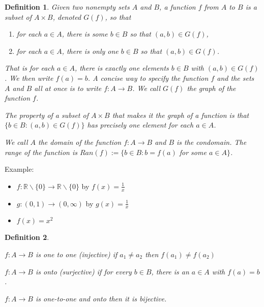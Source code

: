 \documentclass[12pt]{article}
\theoremstyle{plain}
\newtheorem{definition}{Definition}[subsection]
\begin{document}
	\begin{definition}
		Given two nonempty sets $A$ and $B$, a function $f$ from $A$ to $B$ is a 
		subset of $A \times B$, denoted $G(f)$, so that
		\begin{enumerate}
			\item for each $a\in A$, there is some $b\in B$ so that $(a,b) \in G(f)$,
			\item for each $a\in A$, there is only one $b\in B$ so that $(a,b) \in 
				G(f)$.
		\end{enumerate}
		That is for each $a\in A$, there is exactly one elements $b\in B$ with 
		$(a,b)\in G(f)$. We then write $f(a)=b$. A concise way to specify the 
		function $f$ and the sets $A$ and $B$ all at once is to write $f:A\to B$.
		We call $G(f)$ the graph of the function $f$. 

		The property of a subset of $A\times B$ that makes it the graph of a 
		function is that $\{b \in B : (a,b) \in G(f)\}$ has precisely one element
		for each $a\in A$.

		We call $A$ the domain of the function $f: A\to B$ and $B$ is the condomain.
		The range of the function is $Ran(f):=\{b\in B : b= f(a)$
		for some $a\in A \}$.\\
	\end{definition}
    
  {\color{Brown}
  	Example: 
    \begin{itemize}
        \item $f: \mathbb{R} \backslash \{0\} \to \mathbb{R}\backslash \{0\}$ 
        	by $f(x)= \frac1x$
        \item $g:(0, 1) \to (0, \infty)$ by $g(x) = \frac 1x$
        \item $f(x) = x^2$\\
    \end{itemize}
		}

		
		\begin{definition}
			$ $
			
			\begin{description}
        \item $f: A\to B$ is one to one (injective) if $a_1\neq a_2$ 
        then $f(a_1)\neq f(a_2)$ 
        \item $f: A\to B$ is onto (surjective) if for every $b\in B$,
            there is an $a\in A$ with $f(a)=b$. 
        \item $f: A \to B$ is one-to-one and onto then it is bijective.
			\end{description}
		\end{definition}
    
\end{document}
